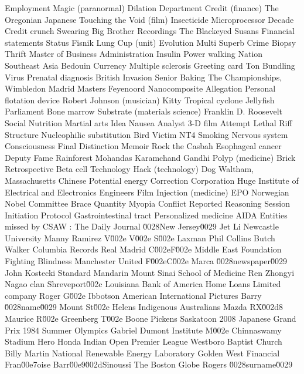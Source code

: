 Employment  Magic (paranormal)  Dilation  
Department  Credit (finance)  The Oregonian  
Japanese  Touching the Void (film)  Insecticide  
Microprocessor  Decade  Credit crunch  
Swearing  Big Brother Recordings  The Blackeyed Susans  
Financial statements  Status  Fisnik  
Lung  Cup (unit)  Evolution  
Multi  Superb  Crime  
Biopsy  Thrift  Master of Business Administration  
Insulin  Power walking  Nation  
Southeast Asia  Bedouin  Currency  
Multiple sclerosis  Greeting card  Ton  
Bundling  Virus  Prenatal diagnosis  
British Invasion  Senior  Baking  
The Championships, Wimbledon  Madrid Masters  Feyenoord  
Nanocomposite  Allegation  Personal flotation device  
Robert Johnson (musician)  Kitty  Tropical cyclone  
Jellyfish  Parliament  Bone marrow  
Substrate (materials science)  Franklin D. Roosevelt  Social  
Nutrition  Martial arts  Idea  
Nausea  Analyst  3-D film  
Attempt  Lethal  Riff  
Structure  Nucleophilic substitution  Bird  
Victim  NT4  Smoking  
Nervous system  Consciousness  Final  
Distinction  Memoir  Rock the Casbah  
Esophageal cancer  Deputy  Fame  
Rainforest  Mohandas Karamchand Gandhi  Polyp (medicine)  
Brick  Retrospective  Beta cell  
Technology  Hack (technology)  Dog  
Waltham, Massachusetts  Chinese  Potential energy  
Correction  Corporation  Huge  
Institute of Electrical and Electronics Engineers  Film  Injection (medicine)  
EPO  Norwegian Nobel Committee  Brace  
Quantity  Myopia  Conflict  
Reported  Reasoning  Session Initiation Protocol  
Gastrointestinal tract  Personalized medicine  AIDA Entities missed by CSAW : 
The Daily Journal \u0028New Jersey\u0029  
Jet Li  Newcastle University  Manny Ramirez  
V\u002e V\u002e S\u002e Laxman  Phil Collins  Butch Walker  
Columbia Records  Real Madrid C\u002eF\u002e  Middle East  
Foundation Fighting Blindness  Manchester United F\u002eC\u002e  Marca \u0028newspaper\u0029  
John Kostecki  Standard Mandarin  Mount Sinai School of Medicine  
Ren Zhongyi  Nagao clan  Shreveport\u002c Louisiana  
Bank of America Home Loans  Limited company  Roger G\u002e Ibbotson  
American International Pictures  Barry \u0028name\u0029  Mount St\u002e Helens  
Indigenous Australians  Mazda RX\u002d8  Maurice R\u002e Greenberg  
T\u002e Boone Pickens  Saskatoon  2008 Japanese Grand Prix  
1984 Summer Olympics  Gabriel Dumont Institute  M\u002e Chinnaswamy Stadium  
Hero Honda Indian Open  Premier League  Westboro Baptist Church  
Billy Martin  National Renewable Energy Laboratory  Golden West Financial  
Fran\u00e7oise Barr\u00e9\u002dSinoussi  The Boston Globe  Rogers \u0028surname\u0029  
